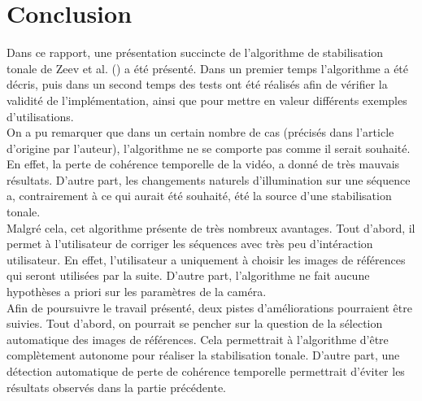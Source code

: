 \section{Conclusion}

Dans ce rapport, une présentation succincte de l'algorithme de stabilisation tonale de Zeev et al. (\cite{farbman2011tonal}) a été présenté. Dans un premier temps l'algorithme a été décris, puis dans un second temps des tests ont été réalisés afin de vérifier la validité de l'implémentation, ainsi que pour mettre en valeur différents exemples d'utilisations.\\

On a pu remarquer que dans un certain nombre de cas (précisés dans l'article d'origine par l'auteur), l'algorithme ne se comporte pas comme il serait souhaité. En effet, la perte de cohérence temporelle de la vidéo, a donné de très mauvais résultats. D'autre part, les changements naturels d'illumination sur une séquence a, contrairement à ce qui aurait été souhaité, été la source d'une stabilisation tonale.\\

Malgré cela, cet algorithme présente de très nombreux avantages. Tout d'abord, il permet à l'utilisateur de corriger les séquences avec très peu d'intéraction utilisateur. En effet, l'utilisateur a uniquement à choisir les images de références qui seront utilisées par la suite. D'autre part, l'algorithme ne fait aucune hypothèses a priori sur les paramètres de la caméra.\\

Afin de poursuivre le travail présenté, deux pistes d'améliorations pourraient être suivies. Tout d'abord, on pourrait se pencher sur la question de la sélection automatique des images de références. Cela permettrait à l'algorithme d'être complètement autonome pour réaliser la stabilisation tonale. D'autre part, une détection automatique de perte de cohérence temporelle permettrait d'éviter les résultats observés dans la partie précédente.